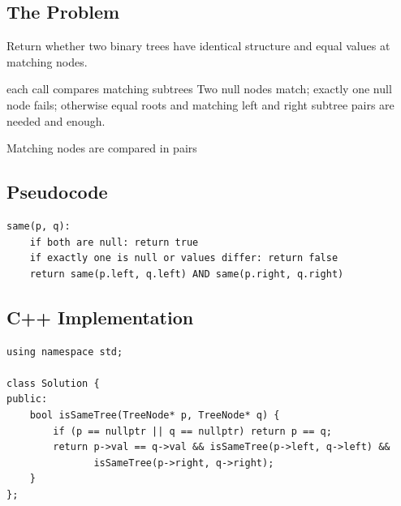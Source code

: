 
\subsection{The Problem}
Return whether two binary trees have identical structure and equal values at
matching nodes.

\begin{invariantbox}{each call compares matching subtrees}
Two null nodes match; exactly one null node fails; otherwise equal roots and
matching left and right subtree pairs are needed and enough.
\end{invariantbox}

\begin{visualbox}{Matching nodes are compared in pairs}
\centering
{}
\end{visualbox}

\subsection{Pseudocode}
\begin{lstlisting}[style=pseudocode]
same(p, q):
    if both are null: return true
    if exactly one is null or values differ: return false
    return same(p.left, q.left) AND same(p.right, q.right)
\end{lstlisting}

\subsection{C++ Implementation}
\begin{lstlisting}[style=compactcode,caption={Complete C++ solution: Same Tree}]
using namespace std;

class Solution {
public:
    bool isSameTree(TreeNode* p, TreeNode* q) {
        if (p == nullptr || q == nullptr) return p == q;
        return p->val == q->val && isSameTree(p->left, q->left) &&
               isSameTree(p->right, q->right);
    }
};
\end{lstlisting}

